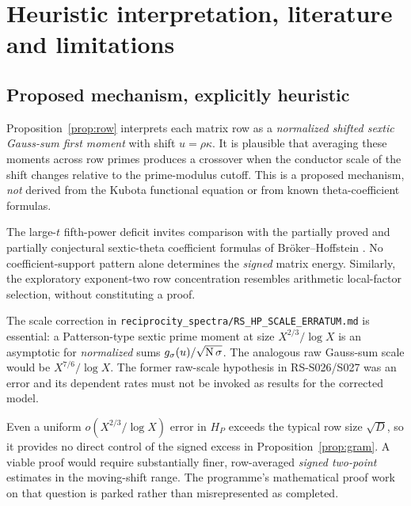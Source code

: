 \section{Heuristic interpretation, literature and limitations}\label{sec:heuristic}
\subsection{Proposed mechanism, explicitly heuristic}
Proposition~\ref{prop:row} interprets each matrix row as a
\emph{normalized shifted sextic Gauss-sum first moment}
with shift \(u=\rho\kappa\). It is plausible that
averaging these moments across row primes produces a
crossover when the conductor scale of the shift changes
relative to the prime-modulus cutoff. This is a proposed
mechanism, \emph{not} derived from the Kubota functional
equation or from known theta-coefficient formulas.

The large-\(t\) fifth-power deficit invites comparison
with the partially proved and partially conjectural
sextic-theta coefficient formulas of
Br\"oker--Hoffstein \cite{broeker2013}.
No coefficient-support pattern alone determines the
\emph{signed} matrix energy. Similarly, the exploratory exponent-two
row concentration resembles arithmetic local-factor
selection, without constituting a proof.

The scale correction in
\texttt{reciprocity\_spectra/RS\_HP\_SCALE\_ERRATUM.md}
is essential: a Patterson-type sextic prime moment
at size \(X^{2/3}/\log X\) is an asymptotic for
\emph{normalized} sums \(g_\sigma(u)/\sqrt{\operatorname{N}\sigma}\).
The analogous raw Gauss-sum scale would be
\(X^{7/6}/\log X\). The former raw-scale
hypothesis in RS-S026/S027 was an error and
its dependent rates must not be invoked as
results for the corrected model.

Even a uniform \(o(X^{2/3}/\log X)\) error in
\(H_P\) exceeds the typical row size
\(\sqrt D\), so it provides no direct control
of the signed excess in
Proposition~\ref{prop:gram}.
A viable proof would require substantially
finer, row-averaged \emph{signed two-point}
estimates in the moving-shift range.
The programme's mathematical proof work on
that question is parked rather than
misrepresented as completed.

